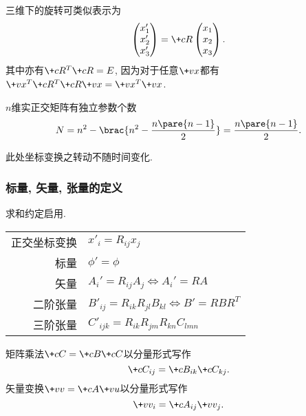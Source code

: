 \documentclass[../LectureNotes.tex]{subfiles}
\begin{document}
\begin{lemma}
    三维下的旋转可类似表示为
    \[ \begin{pmatrix}
        x'_1 \\
        x'_2 \\
        x'_3
    \end{pmatrix} = \+cR \begin{pmatrix}
        x_1 \\
        x_2 \\
        x_3
    \end{pmatrix}. \]
    其中亦有$\+cR^T\+cR = E$, 因为对于任意$\+vx$都有$\+vx^T\+cR^T\+cR\+vx = \+vx^T\+vx$.
\end{lemma}
\begin{lemma}
    $n$维实正交矩阵有独立参数个数
    \[ N = n^2 - \brac{n^2 - \frac{n\pare{n-1}}{2}} = \frac{n\pare{n-1}}{2}. \]
\end{lemma}
\begin{pitfall}
    此处坐标变换之转动不随时间变化.
\end{pitfall}


\subsubsection{标量, 矢量, 张量的定义} %
\label{ssub:标量_矢量_张量的定义}

\begin{mtips}
    求和约定启用.
\end{mtips}
\begin{longtable}{rl}
    正交坐标变换 & $\displaystyle x'_i = R_{ij}x_j$ \\
    标量 & $\phi' = \phi$ \\
    矢量 & $A_i' = R_{ij}A_j\Leftrightarrow A_i' = RA$ \\
    二阶张量 & $B'_{ij} = R_{ik}R_{jl}B_{kl} \Leftrightarrow B' = RBR^T$ \\
    三阶张量 & $C'_{ijk} = R_{ik}R_{jm}R_{kn}C_{lmn}$ \\
\end{longtable}
\begin{mtips}
    矩阵乘法$\+cC = \+cB\+cC$以分量形式写作
    \[ \+cC_{ij} = \+cB_{ik}\+cC_{kj}. \]
    矢量变换$\+vv = \+cA\+vu$以分量形式写作
    \[ \+vv_i = \+cA_{ij}\+vv_j. \]
\end{mtips}


\end{document}
